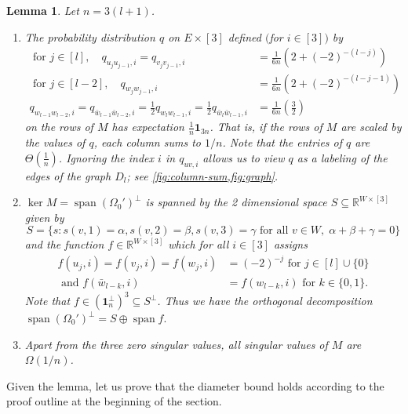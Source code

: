 \documentclass[10pt,a4paper]{article}
\newtheorem{lem}[thm]{Lemma}\crefname{lem}{Lemma}{Lemmas}
\numberwithin{equation}{section}
\DeclareMathOperator{\spn}{span}
\newcommand{\RR}{\mathbb R}
\newcommand{\id}{\mathbf{1}}
\begin{document}
 
 \begin{lem}\label{lem:diameter}Let $n = 3(l + 1)$. 
\begin{enumerate}
\item\label{it:stoch}The probability distribution $q$ on $E\times [3]$ defined $($for $i\in [3])$ by 
\begin{align*}\text{ for }j \in [l], \quad q_{u_j u_{j-1}, i} = q_{v_j v_{j -1}, i} &= \frac{1}{6n} \left(2 + (-2)^{- (l - j)}\right) \\
 \text{ for } j \in [l-2], \quad q_{w_j w_{j -1}, i}  &= \frac{1}{6n} \left(2 + (-2)^{- (l - j - 1)}\right) \\
q_{w_{l-1} w_{l -2}, i} = q_{\bar{w}_{l-1} \bar{w}_{l -2}, i} = \frac{1}{2} q_{w_{l} w_{l -1}, i} = \frac{1}{2} q_{\bar{w}_{l} \bar{w}_{l -1}, i} &= \frac{1}{6n} \left(\frac{3}{2}\right)
\end{align*}
on the rows of $M$ has expectation $\frac{1}{n}\id_{3n}$. That is, if the rows of $M$ are scaled by the values of $q$, each column sums to $1/n$. Note that the entries of $q$ are $\Theta(\frac{1}{n})$. Ignoring the index $i$ in $q_{uv,i}$ allows us to view $q$ as a labeling of the edges of the graph $D_l$; see \cref{fig:column-sum,fig:graph}. 
\item\label{it:kernel} $\ker M = \spn (\Omega_0')^\perp$ is spanned by the 2 dimensional space $S \subseteq \RR^{W \times [3]}$ given by
$$ S = \{s: s(v, 1) = \alpha, s(v, 2) = \beta, s(v, 3) = \gamma \text{ for all } v \in W,\; \alpha + \beta + \gamma = 0 \}$$
 and the function $f \in \RR^{W \times [3]}$ which for all $i \in [3]$ assigns
 \begin{align}f (u_j, i) = f(v_j, i) = f(w_j, i) &= (-2)^{-j} \text{ for } j \in [l] \cup \{0\}\nonumber \\
 \textrm{ and } f(\bar{w}_{l-k}, i)  &=  f(w_{l-k}, i) \text{ for } k \in \{0,1\}.\label{eq:kernel} 
 \end{align}
 Note that $f \in (\id_n^\perp)^3 \subseteq S^\perp$. Thus we have the orthogonal decomposition $\spn(\Omega_0')^\perp = S \oplus \spn{f}.$
\item\label{it:singular} Apart from the three zero singular values, all singular values of $M$ are $\Omega(1/n)$.

\end{enumerate}

\end{lem}


Given the lemma, let us prove that the diameter bound holds according to the proof outline at the beginning of the section.
\end{document}
